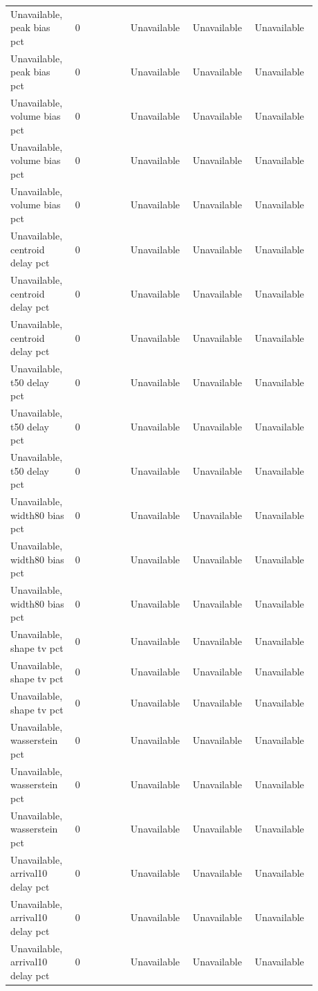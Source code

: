 \begin{longtable}{p{0.1760\linewidth}p{0.1760\linewidth}p{0.1760\linewidth}p{0.1760\linewidth}p{0.1760\linewidth}}
Unavailable, peak bias pct & 0 & Unavailable & Unavailable & Unavailable \\
Unavailable, peak bias pct & 0 & Unavailable & Unavailable & Unavailable \\
Unavailable, volume bias pct & 0 & Unavailable & Unavailable & Unavailable \\
Unavailable, volume bias pct & 0 & Unavailable & Unavailable & Unavailable \\
Unavailable, volume bias pct & 0 & Unavailable & Unavailable & Unavailable \\
Unavailable, centroid delay pct & 0 & Unavailable & Unavailable & Unavailable \\
Unavailable, centroid delay pct & 0 & Unavailable & Unavailable & Unavailable \\
Unavailable, centroid delay pct & 0 & Unavailable & Unavailable & Unavailable \\
Unavailable, t50 delay pct & 0 & Unavailable & Unavailable & Unavailable \\
Unavailable, t50 delay pct & 0 & Unavailable & Unavailable & Unavailable \\
Unavailable, t50 delay pct & 0 & Unavailable & Unavailable & Unavailable \\
Unavailable, width80 bias pct & 0 & Unavailable & Unavailable & Unavailable \\
Unavailable, width80 bias pct & 0 & Unavailable & Unavailable & Unavailable \\
Unavailable, width80 bias pct & 0 & Unavailable & Unavailable & Unavailable \\
Unavailable, shape tv pct & 0 & Unavailable & Unavailable & Unavailable \\
Unavailable, shape tv pct & 0 & Unavailable & Unavailable & Unavailable \\
Unavailable, shape tv pct & 0 & Unavailable & Unavailable & Unavailable \\
Unavailable, wasserstein pct & 0 & Unavailable & Unavailable & Unavailable \\
Unavailable, wasserstein pct & 0 & Unavailable & Unavailable & Unavailable \\
Unavailable, wasserstein pct & 0 & Unavailable & Unavailable & Unavailable \\
Unavailable, arrival10 delay pct & 0 & Unavailable & Unavailable & Unavailable \\
Unavailable, arrival10 delay pct & 0 & Unavailable & Unavailable & Unavailable \\
Unavailable, arrival10 delay pct & 0 & Unavailable & Unavailable & Unavailable \\

\end{longtable}
